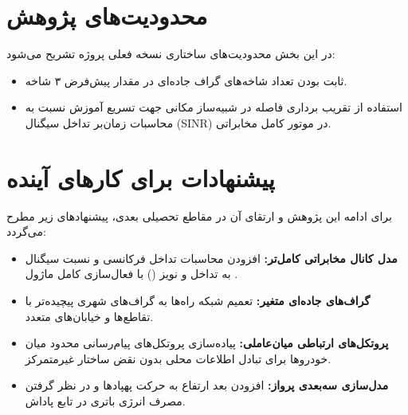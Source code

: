 \documentclass[a4paper,12pt,oneside]{report}
\begin{document}
\section{محدودیت‌های پژوهش}
در این بخش محدودیت‌های ساختاری نسخه فعلی پروژه تشریح می‌شود:
\begin{itemize}
    \item ثابت بودن تعداد شاخه‌های گراف جاده‌ای در مقدار پیش‌فرض ۳ شاخه.
    \item استفاده از تقریب برداری فاصله در شبیه‌ساز مکانی جهت تسریع آموزش نسبت به محاسبات زمان‌بر تداخل سیگنال (SINR) در موتور کامل مخابراتی.
\end{itemize}

\section{پیشنهادات برای کارهای آینده}
برای ادامه این پژوهش و ارتقای آن در مقاطع تحصیلی بعدی، پیشنهادهای زیر مطرح می‌گردد:
\begin{itemize}
    \item \textbf{مدل کانال مخابراتی کامل‌تر:} افزودن محاسبات تداخل فرکانسی و نسبت سیگنال به تداخل و نویز () با فعال‌سازی کامل ماژول .
    \item \textbf{گراف‌های جاده‌ای متغیر:} تعمیم شبکه راه‌ها به گراف‌های شهری پیچیده‌تر با تقاطع‌ها و خیابان‌های متعدد.
    \item \textbf{پروتکل‌های ارتباطی میان‌عاملی:} پیاده‌سازی پروتکل‌های پیام‌رسانی محدود میان خودروها برای تبادل اطلاعات محلی بدون نقض ساختار غیرمتمرکز.
    \item \textbf{مدل‌سازی سه‌بعدی پرواز:} افزودن بعد ارتفاع به حرکت پهپادها و در نظر گرفتن مصرف انرژی باتری در تابع پاداش.
\end{itemize}
\end{document}
